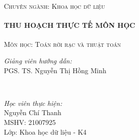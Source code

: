 \documentclass[14pt, a4paper]{article}
\numberwithin{equation}{section}
\numberwithin{figure}{section}
\numberwithin{dl}{section}
\numberwithin{md}{section}
\numberwithin{bd}{section}
\numberwithin{dn}{section}
\numberwithin{hq}{section}
\begin{document}
\begin{titlepage}
        \textsc{\Large Chuyên ngành: Khoa học dữ liệu}\\[0.5cm] %



        \HRule \\[0.4cm]
        { \huge \bfseries THU HOẠCH THỰC TẾ MÔN HỌC}\\[0.4cm] %
        \HRule \\[1.5cm]

        \textsc{\Large Môn học: Toán rời rạc và thuật toán}\\[1cm] %




        \begin{minipage}{0.4\textwidth}
            \begin{flushleft} \large
            \emph{Giảng viên hướng dẫn:} \\
            PGS. TS. Nguyễn Thị Hồng Minh %
            \end{flushleft}
        \end{minipage}\\[0.5cm]

        \begin{minipage}{0.4\textwidth}
        \begin{flushleft} \large
        \emph{Học viên thực hiện:}\\
        Nguyễn Chí Thanh \\
        MSHV: 21007925 \\ %
        Lớp: Khoa học dữ liệu - K4
        \end{flushleft}
        \end{minipage}




\end{titlepage}
\end{document}
